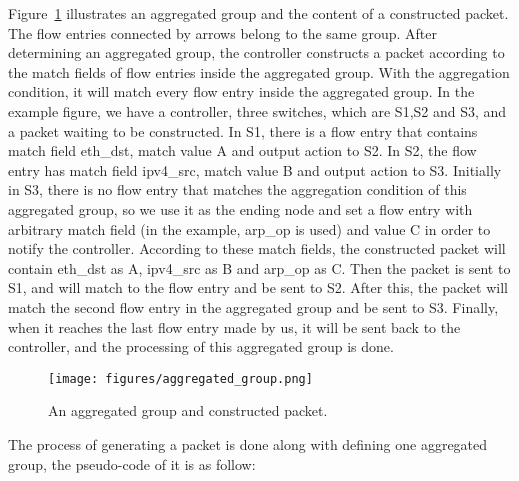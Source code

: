 Figure~\ref{aggregated_group} illustrates an aggregated group and the content of a constructed packet. The flow entries connected by arrows belong to the same group. After determining an aggregated group, the controller constructs a packet according to the match fields of flow entries inside the aggregated group. With the aggregation condition, it will match every flow entry inside the aggregated group. In the example figure, we have a controller, three switches, which are S1,S2 and S3, and a packet waiting to be constructed. In S1, there is a flow entry that contains match field eth\_dst, match value A and output action to S2. In S2, the flow entry has match field ipv4\_src, match value B and output action to S3. Initially in S3, there is no flow entry that matches the aggregation condition of this aggregated group, so we use it as the ending node and set a flow entry with arbitrary match field (in the example, arp\_op is used) and value C in order to notify the controller. According to these match fields, the constructed packet will contain eth\_dst as A, ipv4\_src as B and arp\_op as C. Then the packet is sent to S1, and will match to the flow entry and be sent to S2. After this, the packet will match the second flow entry in the aggregated group and be sent to S3. Finally, when it reaches the last flow entry made by us, it will be sent back to the controller, and the processing of this aggregated group is done.

\begin{figure}[H]
\begin{center}
\texttt{[image: figures/aggregated\_group.png]}
\end{center}
\caption{An aggregated group and constructed packet.}
\label{aggregated_group}
\end{figure}

The process of generating a packet is done along with defining one aggregated group, the pseudo-code of it is as follow:

